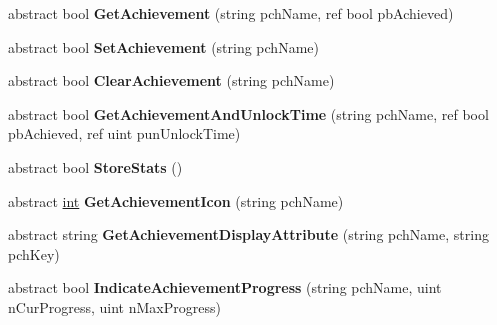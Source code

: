 \begin{DoxyCompactItemize}
\item 
\hypertarget{classValve_1_1Steamworks_1_1ISteamUserStats_ad5e7af4fb419189517d5a35b2477240a}{}abstract bool {\bfseries Get\+Achievement} (string pch\+Name, ref bool pb\+Achieved)\label{classValve_1_1Steamworks_1_1ISteamUserStats_ad5e7af4fb419189517d5a35b2477240a}

\item 
\hypertarget{classValve_1_1Steamworks_1_1ISteamUserStats_a3bbd88c980bd3ed961c740bb0042bc37}{}abstract bool {\bfseries Set\+Achievement} (string pch\+Name)\label{classValve_1_1Steamworks_1_1ISteamUserStats_a3bbd88c980bd3ed961c740bb0042bc37}

\item 
\hypertarget{classValve_1_1Steamworks_1_1ISteamUserStats_a05e78c8f53931439eb6fd4b9380d4458}{}abstract bool {\bfseries Clear\+Achievement} (string pch\+Name)\label{classValve_1_1Steamworks_1_1ISteamUserStats_a05e78c8f53931439eb6fd4b9380d4458}

\item 
\hypertarget{classValve_1_1Steamworks_1_1ISteamUserStats_ad88d9243c1d1d6864115dc5e97d35064}{}abstract bool {\bfseries Get\+Achievement\+And\+Unlock\+Time} (string pch\+Name, ref bool pb\+Achieved, ref uint pun\+Unlock\+Time)\label{classValve_1_1Steamworks_1_1ISteamUserStats_ad88d9243c1d1d6864115dc5e97d35064}

\item 
\hypertarget{classValve_1_1Steamworks_1_1ISteamUserStats_a6f00aff74e8aaed7c2012125d251f1f0}{}abstract bool {\bfseries Store\+Stats} ()\label{classValve_1_1Steamworks_1_1ISteamUserStats_a6f00aff74e8aaed7c2012125d251f1f0}

\item 
\hypertarget{classValve_1_1Steamworks_1_1ISteamUserStats_a5fc03f834ff2cafe2a959ed884b9cfae}{}abstract \hyperlink{SDL__thread_8h_a6a64f9be4433e4de6e2f2f548cf3c08e}{int} {\bfseries Get\+Achievement\+Icon} (string pch\+Name)\label{classValve_1_1Steamworks_1_1ISteamUserStats_a5fc03f834ff2cafe2a959ed884b9cfae}

\item 
\hypertarget{classValve_1_1Steamworks_1_1ISteamUserStats_a6a328b426c8c4a58e1ed0b5526dde794}{}abstract string {\bfseries Get\+Achievement\+Display\+Attribute} (string pch\+Name, string pch\+Key)\label{classValve_1_1Steamworks_1_1ISteamUserStats_a6a328b426c8c4a58e1ed0b5526dde794}

\item 
\hypertarget{classValve_1_1Steamworks_1_1ISteamUserStats_a4aac51c3e8c1dc3b919b28a7d1c193c9}{}abstract bool {\bfseries Indicate\+Achievement\+Progress} (string pch\+Name, uint n\+Cur\+Progress, uint n\+Max\+Progress)\label{classValve_1_1Steamworks_1_1ISteamUserStats_a4aac51c3e8c1dc3b919b28a7d1c193c9}


\end{DoxyCompactItemize}
